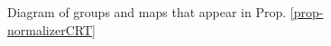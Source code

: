 \documentclass[11pt]{amsart}
\theoremstyle{definition}
\newcommand{\arrow}{\longrightarrow}
\begin{document}
\begin{figure}[ht!]\label{fig-prop3.4}
\label{blah}
\caption{Diagram of groups and maps that appear in Prop. \ref{prop-normalizerCRT}}
\end{figure} 
\end{document}
